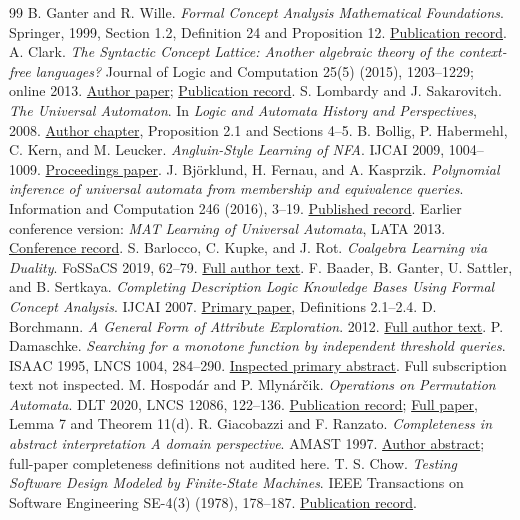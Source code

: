 \documentclass[11pt]{article}
\theoremstyle{remark}
\begin{document}
\begin{thebibliography}{99}
 B. Ganter and R. Wille. \emph{Formal Concept Analysis Mathematical Foundations}. Springer, 1999, Section 1.2, Definition 24 and Proposition 12. \href{https://doi.org/10.1007/978-3-642-59830-2}{Publication record}.
 A. Clark. \emph{The Syntactic Concept Lattice: Another algebraic theory of the context-free languages?} Journal of Logic and Computation 25(5) (2015), 1203--1229; online 2013. \href{https://alexc17.github.io/static/pdfs/JLC2013.pdf}{Author paper}; \href{https://doi.org/10.1093/logcom/ext037}{Publication record}.
 S. Lombardy and J. Sakarovitch. \emph{The Universal Automaton}. In \emph{Logic and Automata History and Perspectives}, 2008. \href{https://perso.telecom-paristech.fr/jsaka/PUB/Files/TUA.pdf}{Author chapter}, Proposition 2.1 and Sections 4--5.
 B. Bollig, P. Habermehl, C. Kern, and M. Leucker. \emph{Angluin-Style Learning of NFA}. IJCAI 2009, 1004--1009. \href{https://www.ijcai.org/Proceedings/09/Papers/170.pdf}{Proceedings paper}.
 J. Björklund, H. Fernau, and A. Kasprzik. \emph{Polynomial inference of universal automata from membership and equivalence queries}. Information and Computation 246 (2016), 3--19. \href{https://doi.org/10.1016/j.ic.2015.11.005}{Published record}. Earlier conference version: \emph{MAT Learning of Universal Automata}, LATA 2013. \href{https://link.springer.com/chapter/10.1007/978-3-642-37064-9_14}{Conference record}.
 S. Barlocco, C. Kupke, and J. Rot. \emph{Coalgebra Learning via Duality}. FoSSaCS 2019, 62--79. \href{https://arxiv.org/html/1902.05762}{Full author text}.
 F. Baader, B. Ganter, U. Sattler, and B. Sertkaya. \emph{Completing Description Logic Knowledge Bases Using Formal Concept Analysis}. IJCAI 2007. \href{https://ijcai.org/proceedings/2007/35}{Primary paper}, Definitions 2.1--2.4.
 D. Borchmann. \emph{A General Form of Attribute Exploration}. 2012. \href{https://arxiv.org/html/1202.4824}{Full author text}.
 P. Damaschke. \emph{Searching for a monotone function by independent threshold queries}. ISAAC 1995, LNCS 1004, 284--290. \href{https://link.springer.com/chapter/10.1007/BFb0015433}{Inspected primary abstract}. Full subscription text not inspected.
 M. Hospodár and P. Mlynárčik. \emph{Operations on Permutation Automata}. DLT 2020, LNCS 12086, 122--136. \href{https://doi.org/10.1007/978-3-030-48516-0_10}{Publication record}; \href{https://pmc.ncbi.nlm.nih.gov/articles/PMC7247878/}{Full paper}, Lemma 7 and Theorem 11(d).
 R. Giacobazzi and F. Ranzato. \emph{Completeness in abstract interpretation A domain perspective}. AMAST 1997. \href{https://profs.sci.univr.it/~giaco/abstracts/amast97.abstract.html}{Author abstract}; full-paper completeness definitions not audited here.
 T. S. Chow. \emph{Testing Software Design Modeled by Finite-State Machines}. IEEE Transactions on Software Engineering SE-4(3) (1978), 178--187. \href{https://doi.org/10.1109/TSE.1978.231496}{Publication record}.
\end{thebibliography}
\end{document}
